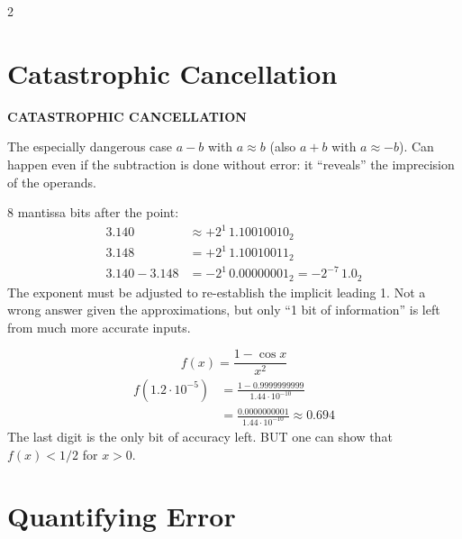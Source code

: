 \documentclass[a4paper,9pt]{extarticle}
\begin{document}
\begin{multicols}{2}
\section{Catastrophic Cancellation}


\begin{definition}

\textbf{CATASTROPHIC CANCELLATION}

The especially dangerous case $a - b$ with $a \approx b$ (also $a + b$ with $a \approx -b$). Can
happen even if the subtraction is done without error: it ``reveals'' the imprecision of the
operands.

\end{definition}


\begin{example}

8 mantissa bits after the point:
\begin{align*}
3.140 &\approx +2^1\,1.10010010_2 \\
3.148 &= +2^1\,1.10010011_2 \\
3.140 - 3.148 &= -2^1\,0.00000001_2 = -2^{-7}\,1.0_2
\end{align*}
The exponent must be adjusted to re-establish the implicit leading 1. Not a wrong answer given
the approximations, but only ``1 bit of information'' is left from much more accurate inputs.

\end{example}


\begin{example}

\[
f(x) = \frac{1 - \cos x}{x^2}
\]
\begin{align*}
f(1.2 \cdot 10^{-5}) &= \frac{1 - 0.9999999999}{1.44 \cdot 10^{-10}} \\
&= \frac{0.0000000001}{1.44 \cdot 10^{-10}} \approx 0.694
\end{align*}
The last digit is the only bit of accuracy left. BUT one can show that $f(x) < 1/2$ for
$x > 0$.

\end{example}



\section{Quantifying Error}


\begin{definition}


\end{definition}
\end{multicols}
\end{document}
